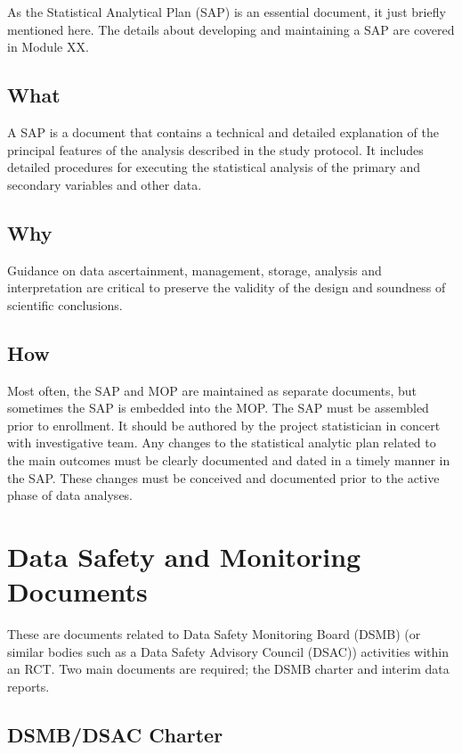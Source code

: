 \documentclass[]{book}
\begin{document}
As the Statistical Analytical Plan (SAP) is an essential document, it
just briefly mentioned here. The details about developing and
maintaining a SAP are covered in Module XX.

\subsection{What}\label{what-13}

A SAP is a document that contains a technical and detailed explanation
of the principal features of the analysis described in the study
protocol. It includes detailed procedures for executing the statistical
analysis of the primary and secondary variables and other data.

\subsection{Why}\label{why-13}

Guidance on data ascertainment, management, storage, analysis and
interpretation are critical to preserve the validity of the design and
soundness of scientific conclusions.

\subsection{How}\label{how-13}

Most often, the SAP and MOP are maintained as separate documents, but
sometimes the SAP is embedded into the MOP. The SAP must be assembled
prior to enrollment. It should be authored by the project statistician
in concert with investigative team. Any changes to the statistical
analytic plan related to the main outcomes must be clearly documented
and dated in a timely manner in the SAP. These changes must be conceived
and documented prior to the active phase of data analyses.

\section{Data Safety and Monitoring
Documents}\label{data-safety-and-monitoring-documents}

These are documents related to Data Safety Monitoring Board (DSMB) (or
similar bodies such as a Data Safety Advisory Council (DSAC)) activities
within an RCT. Two main documents are required; the DSMB charter and
interim data reports.

\subsection{DSMB/DSAC Charter}\label{dsmbdsac-charter}
\end{document}
